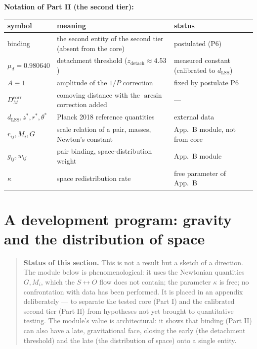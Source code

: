 \documentclass{article}
\begin{document}
\newpage
\noindent\textbf{Notation of Part II (the second tier):}

\begin{table}[htbp]
\centering
\small
\begin{tabular}{@{}lll@{}}
\toprule
\textbf{symbol} & \textbf{meaning} & \textbf{status} \\
\midrule
binding & the second entity of the second tier (absent from the core) & postulated (P6) \\
$\mu_d = 0.980640$ & detachment threshold ($z_{\text{detach}} \approx 4.53$) & measured constant (calibrated to $d_{\text{LSS}}$) \\
$A \equiv 1$ & amplitude of the $1/P$ correction & fixed by postulate P6 \\
$D_M^{\text{corr}}$ & comoving distance with the $\arcsin$ correction added & --- \\
$d_{\text{LSS}}, z^*, r^*, \theta^*$ & Planck 2018 reference quantities & external data \\
$r_{ij}, M_i, G$ & scale relation of a pair, masses, Newton's constant & App.\ B module, not from core \\
$g_{ij}, w_{ij}$ & pair binding, space-distribution weight & App.\ B module \\
$\kappa$ & space redistribution rate & free parameter of App.\ B \\
\bottomrule
\end{tabular}
\end{table}

\section{A development program: gravity and the distribution of space}

\begin{quote}
\textbf{Status of this section.} This is not a result but a sketch of a direction. The module below is phenomenological: it uses the Newtonian quantities $G, M_i$, which the $S \leftrightarrow O$ flow does not contain; the parameter $\kappa$ is free; no confrontation with data has been performed. It is placed in an appendix deliberately --- to separate the tested core (Part I) and the calibrated second tier (Part II) from hypotheses not yet brought to quantitative testing. The module's value is architectural: it shows that binding (Part II) can also have a late, gravitational face, closing the early (the detachment threshold) and the late (the distribution of space) onto a single entity.
\end{quote}
\end{document}
